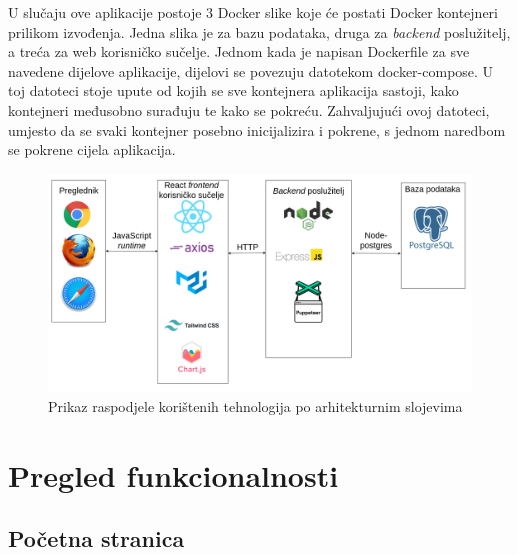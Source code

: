 \documentclass[times, utf8, zavrsni]{fer}
\begin{document}
U slučaju ove aplikacije postoje 3 Docker slike koje će postati Docker kontejneri prilikom izvođenja. Jedna slika je za bazu podataka,
druga za \emph{backend} poslužitelj, a treća za web korisničko sučelje. Jednom kada je napisan Dockerfile za sve navedene dijelove aplikacije, dijelovi se povezuju  
datotekom docker-compose. U toj datoteci stoje upute od kojih se sve kontejnera aplikacija sastoji, kako kontejneri međusobno surađuju te kako se pokreću. Zahvaljujući 
ovoj datoteci, umjesto da se svaki kontejner posebno inicijalizira i pokrene, s jednom naredbom se pokrene cijela aplikacija.
\\
\begin{figure}[htb]
    \includegraphics[scale=0.3]{tehnologije.png}
    \caption{Prikaz raspodjele korištenih tehnologija po arhitekturnim slojevima}
    \label{fig:arhitektura}
    \end{figure}
\chapter{Pregled funkcionalnosti}
\section{Početna stranica}
\end{document}
